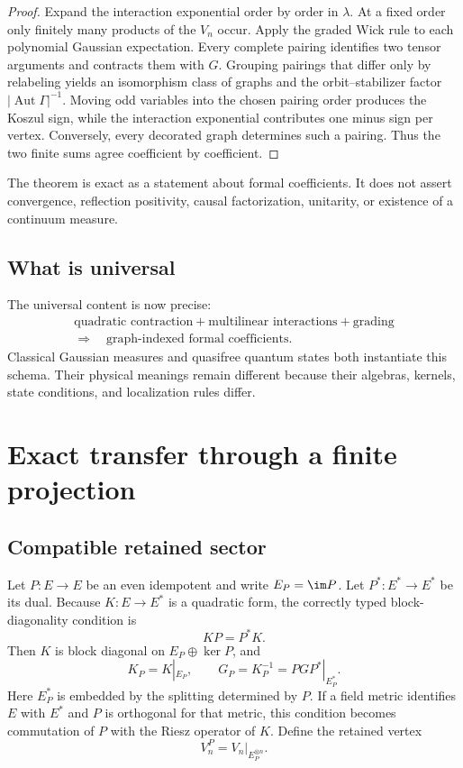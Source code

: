 \documentclass[11pt,a4paper]{article}
\newcommand{\Aut}{\operatorname{Aut}}
\begin{document}
\begin{proof}
Expand the interaction exponential order by order in \(\lambda\).  At a
fixed order only finitely many products of the \(V_n\) occur.  Apply the
graded Wick rule to each polynomial Gaussian expectation.  Every complete
pairing identifies two tensor arguments and contracts them with \(G\).
Grouping pairings that differ only by relabeling yields an isomorphism
class of graphs and the orbit--stabilizer factor
\(|\Aut\Gamma|^{-1}\).  Moving odd variables into the chosen pairing order
produces the Koszul sign, while the interaction exponential contributes
one minus sign per vertex. Conversely, every decorated graph determines
such a pairing.  Thus the two finite sums agree coefficient by
coefficient.
\end{proof}

\begin{remark}
The theorem is exact as a statement about formal coefficients.  It does
not assert convergence, reflection positivity, causal factorization,
unitarity, or existence of a continuum measure.
\end{remark}

\subsection{What is universal}

The universal content is now precise:
\[
\begin{gathered}
\text{quadratic contraction}
+\text{multilinear interactions}
+\text{grading}\\
\Longrightarrow\quad
\text{graph-indexed formal coefficients}.
\end{gathered}
\]
Classical Gaussian measures and quasifree quantum states both instantiate
this schema.  Their physical meanings remain different because their
algebras, kernels, state conditions, and localization rules differ.

\section{Exact transfer through a finite projection}

\subsection{Compatible retained sector}

Let \(P:E\to E\) be an even idempotent and write \(E_P=\im P\).
Let $P^*:E^*\to E^*$ be its dual. Because $K:E\to E^*$ is a
quadratic form, the correctly typed block-diagonality condition is
\begin{equation}
 KP=P^*K.
 \label{eq:PK}
\end{equation}
Then \(K\) is block diagonal on \(E_P\oplus\ker P\), and
\[
 K_P=K|_{E_P},\qquad G_P=K_P^{-1}=PGP^*|_{E_P^*}.
\]
Here $E_P^*$ is embedded by the splitting determined by $P$. If a field
metric identifies $E$ with $E^*$ and $P$ is orthogonal for that metric,
this condition becomes commutation of $P$ with the Riesz operator of $K$.
Define the retained vertex
\[
 V_n^P=V_n|_{E_P^{\otimes n}}.
\]
\end{document}
